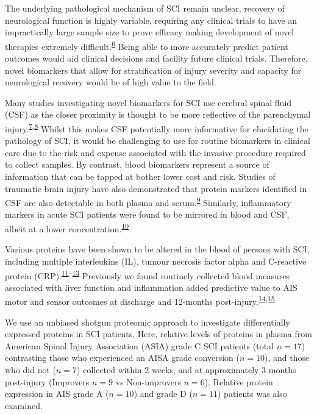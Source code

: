 \documentclass[
]{article}
\begin{document}
The underlying pathological mechanism of SCI remain unclear, recovery of neurological function is highly variable, requiring any clinical trials to have an impractically large sample size to prove efficacy making development of novel therapies extremely difficult.\textsuperscript{\protect\hyperlink{ref-spiess_conversion_2009}{6}}
Being able to more accurately predict patient outcomes would aid clinical decisions and facility future clinical trials.
Therefore, novel biomarkers that allow for stratification of injury severity and capacity for neurological recovery would be of high value to the field.

Many studies investigating novel biomarkers for SCI use cerebral spinal fluid (CSF) as the closer proximity is thought to be more reflective of the parenchymal injury.\textsuperscript{\protect\hyperlink{ref-kwon_neurochemical_2019}{7},\protect\hyperlink{ref-hulme_developing_2017}{8}}
Whilst this makes CSF potentially more informative for elucidating the pathology of SCI, it would be challenging to use for routine biomarkers in clinical care due to the risk and expense associated with the invasive procedure required to collect samples.
By contrast, blood biomarkers represent a source of information that can be tapped at bother lower cost and risk.
Studies of traumatic brain injury have also demonstrated that protein markers identified in CSF are also detectable in both plasma and serum.\textsuperscript{\protect\hyperlink{ref-wang_update_2018}{9}}
Similarly, inflammatory markers in acute SCI patients were found to be mirrored in blood and CSF, albeit at a lower concentration.\textsuperscript{\protect\hyperlink{ref-kwon_cerebrospinal_2010}{10}}

Various proteins have been shown to be altered in the blood of persons with SCI, including multiple interleukins (IL), tumour necrosis factor alpha and C-reactive protein (CRP).\textsuperscript{\protect\hyperlink{ref-segal_circulating_1997}{11}--\protect\hyperlink{ref-frost_inflammatory_2005}{13}}
Previously we found routinely collected blood measures associated with liver function and inflammation added predictive value to AIS motor and sensor outcomes at discharge and 12-months post-injury.\textsuperscript{\protect\hyperlink{ref-bernardo_harrington_routinely_2020}{14},\protect\hyperlink{ref-brown_preliminary_2019}{15}}

We use an unbiased shotgun proteomic approach to investigate differentially expressed proteins in SCI patients.
Here, relative levels of proteins in plasma from American Spinal Injury Association (ASIA) grade C SCI patients (total \(n = 17\)) contrasting those who experienced an AISA grade conversion (\(n = 10\)), and those who did not (\(n = 7\)) collected within 2 weeks, and at approximately 3 months post-injury (Improvers \(n = 9\) vs Non-improvers \(n = 6\)).
Relative protein expression in AIS grade A (\(n = 10\)) and grade D (\(n = 11\)) patients was also examined.
\end{document}
